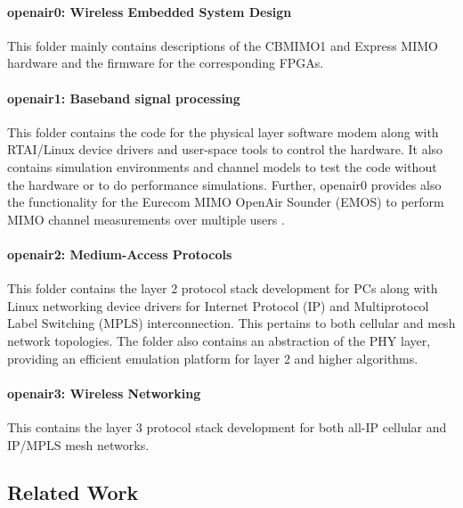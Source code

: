 \documentclass[a4paper,twocolumn,journal]{IEEEtran}
\begin{document}
\paragraph{openair0: Wireless Embedded System Design}
This folder mainly contains descriptions of the CBMIMO1 and Express MIMO hardware and the firmware for the corresponding FPGAs.  
\paragraph{openair1: Baseband signal processing}
This folder contains the code for the physical layer software modem along with RTAI/Linux device drivers and user-space tools to control the hardware. 
It also contains simulation environments and channel models to test the code without the hardware or to do performance simulations. Further, openair0 provides also the functionality for the Eurecom MIMO OpenAir Sounder (EMOS) to perform MIMO channel measurements over multiple users \cite{kaltenberger09}.
\paragraph{openair2: Medium-Access Protocols}
This folder contains the layer 2 protocol stack development for PCs along with Linux networking device drivers for Internet Protocol (IP) and Multiprotocol Label Switching (MPLS) interconnection.  This pertains to both cellular and mesh network topologies. The folder also contains an abstraction of the PHY layer, providing an efficient emulation platform for layer 2 and higher algorithms. 
\paragraph{openair3: Wireless Networking}
This contains the layer 3 protocol stack development for both all-IP cellular and IP/MPLS mesh networks. 




\subsection{Related Work}
\label{sec:related}
\end{document}
